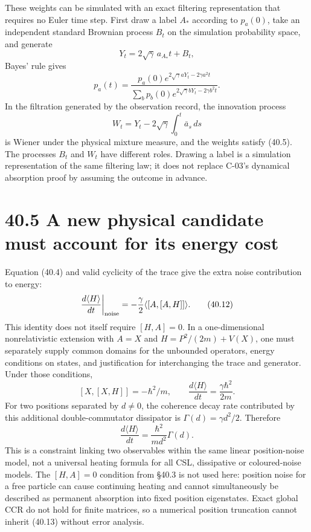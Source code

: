 \documentclass[
  11pt,
  oneside]{book}
\begin{document}
These weights can be simulated with an exact filtering representation
that requires no Euler time step. First draw a label \(A_*\) according
to \(p_a(0)\), take an independent standard Brownian process \(B_t\) on
the simulation probability space, and generate \[
Y_t=2\sqrt\gamma\,a_{A_*}t+B_t,
\] Bayes' rule gives \[
p_a(t)=
\frac{p_a(0)e^{2\sqrt\gamma aY_t-2\gamma a^2t}}
{\sum_b p_b(0)e^{2\sqrt\gamma bY_t-2\gamma b^2t}}.
\tag{40.11}
\] In the filtration generated by the observation record, the innovation
process \[
W_t=Y_t-2\sqrt\gamma\int_0^t\bar a_s\,ds
\] is Wiener under the physical mixture measure, and the weights satisfy
(40.5). The processes \(B_t\) and \(W_t\) have different roles. Drawing
a label is a simulation representation of the same filtering law; it
does not replace C-03's dynamical absorption proof by assuming the
outcome in advance.

\section{40.5 A new physical candidate must account for its energy cost}

Equation (40.4) and valid cyclicity of the trace give the extra noise
contribution to energy: \[
\frac{d\langle H\rangle}{dt}\bigg|_{\rm noise}
=-\frac\gamma2\langle[A,[A,H]]\rangle.
\tag{40.12}
\] This identity does not itself require \([H,A]=0\). In a
one-dimensional nonrelativistic extension with \(A=X\) and
\(H=P^2/(2m)+V(X)\), one must separately supply common domains for the
unbounded operators, energy conditions on states, and justification for
interchanging the trace and generator. Under those conditions, \[
[X,[X,H]]=-\hbar^2/m,
\qquad\frac{d\langle H\rangle}{dt}=\frac{\gamma\hbar^2}{2m}.
\tag{40.13}
\] For two positions separated by \(d\ne0\), the coherence decay rate
contributed by this additional double-commutator dissipator is
\(\Gamma(d)=\gamma d^2/2\). Therefore \[
\boxed{\frac{d\langle H\rangle}{dt}
=\frac{\hbar^2}{md^2}\Gamma(d).}
\tag{40.14}
\] This is a constraint linking two observables within the same linear
position-noise model, not a universal heating formula for all CSL,
dissipative or coloured-noise models. The \([H,A]=0\) condition from
§40.3 is not used here: position noise for a free particle can cause
continuing heating and cannot simultaneously be described as permanent
absorption into fixed position eigenstates. Exact global CCR do not hold
for finite matrices, so a numerical position truncation cannot inherit
(40.13) without error analysis.
\end{document}
